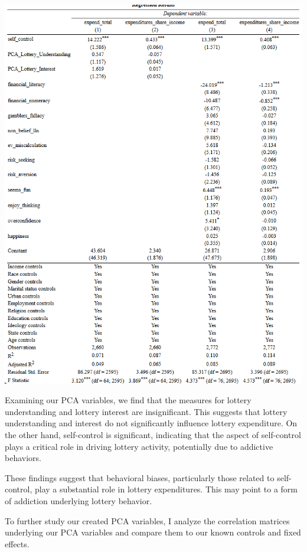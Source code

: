 \documentclass[
  12pt]{article}
\begin{document}
\includegraphics{images/6-01.png}

Examining our PCA variables, we find that the measures for lottery
understanding and lottery interest are insignificant. This suggests that
lottery understanding and interest do not significantly influence
lottery expenditure. On the other hand, self-control is significant,
indicating that the aspect of self-control plays a critical role in
driving lottery activity, potentially due to addictive behaviors.

These findings suggest that behavioral biases, particularly those
related to self-control, play a substantial role in lottery
expenditures. This may point to a form of addiction underlying lottery
behavior.

To further study our created PCA variables, I analyze the correlation
matrices underlying our PCA variables and compare them to our known
controls and fixed effects.
\end{document}
